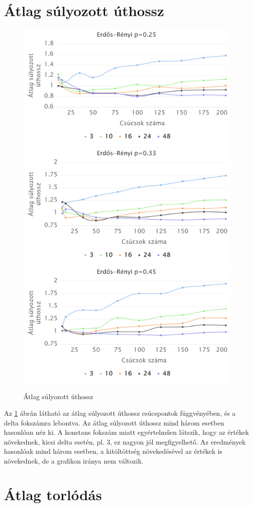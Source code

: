 \documentclass[12pt]{report}
\begin{document}
\section{Átlag súlyozott úthossz}

\begin{figure}[h]
	\begin{center}
		\includegraphics[width=0.49\linewidth]{pictures/constant_dan_ratio25_avg_route_len.png}
		\includegraphics[width=0.49\linewidth]{pictures/constant_dan_ratio33_avg_route_len.png}
		\includegraphics[width=0.49\linewidth]{pictures/constant_dan_ratio45_avg_route_len.png}
		\caption{Átlag súlyozott úthossz}
		\label{avg-len}
	\end{center}
\end{figure}


Az \ref{avg-len} ábrán látható az átlag súlyozott úthossz csúcspontok függvényében, és a delta fokszámra lebontva.
Az átlag súlyozott úthossz mind három esetben hasonlóan néz ki.
A konstans fokszám miatt egyértelműen látszik, hogy az értékek növekednek, kicsi delta esetén, pl. 3, ez nagyon jól megfigyelhető.
Az eredmények hasonlóak mind három esetben, a kitöltöttség növekedésével az értékek is növekednek, de a grafikon iránya nem változik.

\section{Átlag torlódás}
\end{document}
